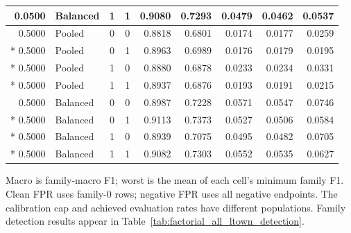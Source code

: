 \begin{longtable}{@{}rlccrrrrr@{}}
0.0500 & Balanced & 1 & 1 & 0.9080 & 0.7293 & 0.0479 & 0.0462 & 0.0537 \\
\midrule
0.5000 & Pooled & 0 & 0 & 0.8818 & 0.6801 & 0.0174 & 0.0177 & 0.0259 \\*
0.5000 & Pooled & 0 & 1 & 0.8963 & 0.6989 & 0.0176 & 0.0179 & 0.0195 \\*
0.5000 & Pooled & 1 & 0 & 0.8880 & 0.6878 & 0.0233 & 0.0234 & 0.0331 \\*
0.5000 & Pooled & 1 & 1 & 0.8937 & 0.6876 & 0.0193 & 0.0191 & 0.0215 \\
\midrule
0.5000 & Balanced & 0 & 0 & 0.8987 & 0.7228 & 0.0571 & 0.0547 & 0.0746 \\*
0.5000 & Balanced & 0 & 1 & 0.9113 & 0.7373 & 0.0527 & 0.0506 & 0.0584 \\*
0.5000 & Balanced & 1 & 0 & 0.8939 & 0.7075 & 0.0495 & 0.0482 & 0.0705 \\*
0.5000 & Balanced & 1 & 1 & 0.9082 & 0.7303 & 0.0552 & 0.0535 & 0.0627 \\
\end{longtable}
\noindent\footnotesize Macro is family-macro F1; worst is the mean of each cell's minimum family F1. Clean FPR uses family-0 rows; negative FPR uses all negative endpoints. The calibration cap and achieved evaluation rates have different populations. Family detection results appear in Table~\ref{tab:factorial_all_ltown_detection}.
\par\endgroup
